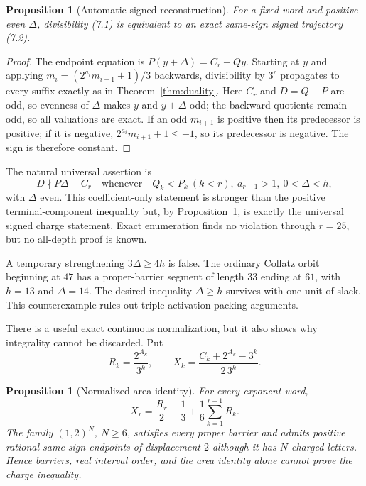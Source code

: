 \documentclass[11pt,reqno]{amsart}
\newtheorem{proposition}[theorem]{Proposition}
\theoremstyle{remark}
\begin{document}
\begin{proposition}[Automatic signed reconstruction]\label{prop:signed}
For a fixed word and positive even $\Delta$, divisibility (7.1) is equivalent
to an exact same-sign signed trajectory (7.2).
\end{proposition}

\begin{proof}
The endpoint equation is $P(y+\Delta)=C_r+Qy$.  Starting at $y$ and applying
$m_i=(2^{a_i}m_{i+1}+1)/3$ backwards, divisibility by $3^r$ propagates to
every suffix exactly as in Theorem~\ref{thm:duality}.  Here $C_r$ and
$D=Q-P$ are odd, so evenness of $\Delta$ makes $y$ and $y+\Delta$ odd; the
backward quotients remain odd, so all
valuations are exact.  If an odd $m_{i+1}$ is positive then its predecessor is
positive; if it is negative, $2^{a_i}m_{i+1}+1\le-1$, so its predecessor is
negative.  The sign is therefore constant.
\end{proof}

The natural universal assertion is
\[
 D\nmid P\Delta-C_r
 \quad\text{whenever}\quad
 Q_k<P_k\ (k<r),\ a_{r-1}>1,\ 0<\Delta<h,            \tag{7.3}
\]
with $\Delta$ even.  This coefficient-only statement is stronger than the
positive terminal-component inequality but, by
Proposition~\ref{prop:signed}, is exactly the universal signed charge
statement.  Exact enumeration finds no violation through $r=25$, but no
all-depth proof is known.

A temporary strengthening $3\Delta\ge4h$ is false.  The ordinary Collatz
orbit beginning at $47$ has a proper-barrier segment of length $33$ ending
at $61$, with $h=13$ and $\Delta=14$.  The desired inequality
$\Delta\ge h$ survives with one unit of slack.  This counterexample rules
out triple-activation packing arguments.

There is a useful exact continuous normalization, but it also shows why
integrality cannot be discarded.  Put
\[
 R_k=\frac{2^{A_k}}{3^k},\qquad
 X_k=\frac{C_k+2^{A_k}-3^k}{2\,3^k}.
\]

\begin{proposition}[Normalized area identity]\label{prop:area}
For every exponent word,
\[
 X_r=\frac{R_r}{2}-\frac13+\frac16\sum_{k=1}^{r-1}R_k.
\]
The family $(1,2)^N$, $N\ge6$, satisfies every proper barrier and admits
positive rational same-sign endpoints of displacement $2$ although it has
$N$ charged letters.  Hence barriers, real interval order, and the area
identity alone
cannot prove the charge inequality.
\end{proposition}
\end{document}

